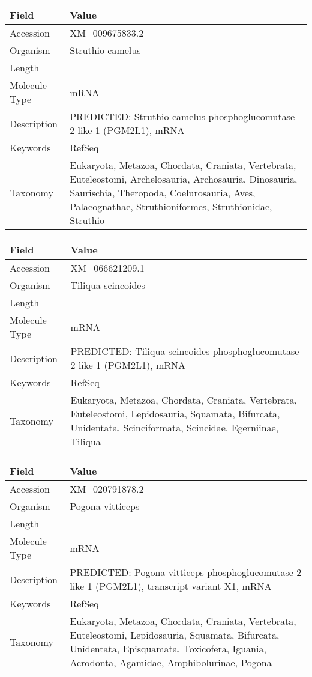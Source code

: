 \documentclass[10pt]{article}
\begin{document}
{\footnotesize
\begin{longtable}{>{\raggedright\arraybackslash}p{4.5cm} >{\raggedright\arraybackslash}p{11.5cm}}
\textbf{Field} & \textbf{Value} \\
\hline
Accession & XM\_009675833.2 \\
Organism & Struthio camelus \\
Length & 5760 \\
Molecule Type & mRNA \\
Description & PREDICTED: Struthio camelus phosphoglucomutase 2 like 1 (PGM2L1), mRNA \\
Keywords & RefSeq \\
Taxonomy & Eukaryota, Metazoa, Chordata, Craniata, Vertebrata, Euteleostomi, Archelosauria, Archosauria, Dinosauria, Saurischia, Theropoda, Coelurosauria, Aves, Palaeognathae, Struthioniformes, Struthionidae, Struthio \\
\end{longtable}
}

{\footnotesize
\begin{longtable}{>{\raggedright\arraybackslash}p{4.5cm} >{\raggedright\arraybackslash}p{11.5cm}}
\textbf{Field} & \textbf{Value} \\
\hline
Accession & XM\_066621209.1 \\
Organism & Tiliqua scincoides \\
Length & 4164 \\
Molecule Type & mRNA \\
Description & PREDICTED: Tiliqua scincoides phosphoglucomutase 2 like 1 (PGM2L1), mRNA \\
Keywords & RefSeq \\
Taxonomy & Eukaryota, Metazoa, Chordata, Craniata, Vertebrata, Euteleostomi, Lepidosauria, Squamata, Bifurcata, Unidentata, Scinciformata, Scincidae, Egerniinae, Tiliqua \\
\end{longtable}
}

{\footnotesize
\begin{longtable}{>{\raggedright\arraybackslash}p{4.5cm} >{\raggedright\arraybackslash}p{11.5cm}}
\textbf{Field} & \textbf{Value} \\
\hline
Accession & XM\_020791878.2 \\
Organism & Pogona vitticeps \\
Length & 4291 \\
Molecule Type & mRNA \\
Description & PREDICTED: Pogona vitticeps phosphoglucomutase 2 like 1 (PGM2L1), transcript variant X1, mRNA \\
Keywords & RefSeq \\
Taxonomy & Eukaryota, Metazoa, Chordata, Craniata, Vertebrata, Euteleostomi, Lepidosauria, Squamata, Bifurcata, Unidentata, Episquamata, Toxicofera, Iguania, Acrodonta, Agamidae, Amphibolurinae, Pogona \\
\end{longtable}
}
\end{document}
